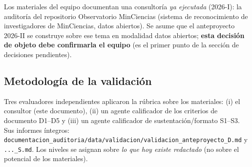 Los materiales del equipo documentan una consultoría \emph{ya ejecutada}
(2026-I): la auditoría del repositorio Observatorio MinCiencias (sistema de
reconocimiento de investigadores de MinCiencias, datos abiertos). Se asume que
el anteproyecto 2026-II se construye sobre ese tema en modalidad datos
abiertos; \textbf{esta decisión de objeto debe confirmarla el equipo} (es el
primer punto de la sección de decisiones pendientes).

\subsection{Metodología de la validación}

Tres evaluadores independientes aplicaron la rúbrica sobre los materiales:
(i) el consultor (este documento), (ii) un agente calificador de los criterios
de documento D1--D5 y (iii) un agente calificador de sustentación/formato
S1--S3. Sus informes íntegros:
\texttt{documentacion\_auditoria/data/validacion/validacion\_anteproyecto\_D.md}
y \texttt{...\_S.md}. Los niveles se asignan sobre \emph{lo que hoy existe
redactado} (no sobre el potencial de los materiales).
